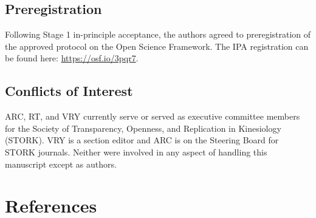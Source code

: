 \documentclass[]{cik}%
\begin{document}
\hypertarget{preregistration}{%
\subsection{Preregistration}\label{preregistration}}

Following Stage 1 in-principle acceptance, the authors agreed to
preregistration of the approved protocol on the Open Science Framework.
The IPA registration can be found here: \url{https://osf.io/3pqr7}.

\hypertarget{conflicts-of-interest}{%
\subsection{Conflicts of Interest}\label{conflicts-of-interest}}

ARC, RT, and VRY currently serve or served as executive committee
members for the Society of Transparency, Openness, and Replication in
Kinesiology (STORK). VRY is a section editor and ARC is on the Steering
Board for STORK journals. Neither were involved in any aspect of
handling this manuscript except as authors.

\newpage

\hypertarget{references}{%
\section{References}\label{references}}

\parindent0pt 
\setlength{\parskip}{1em}
\end{document}
